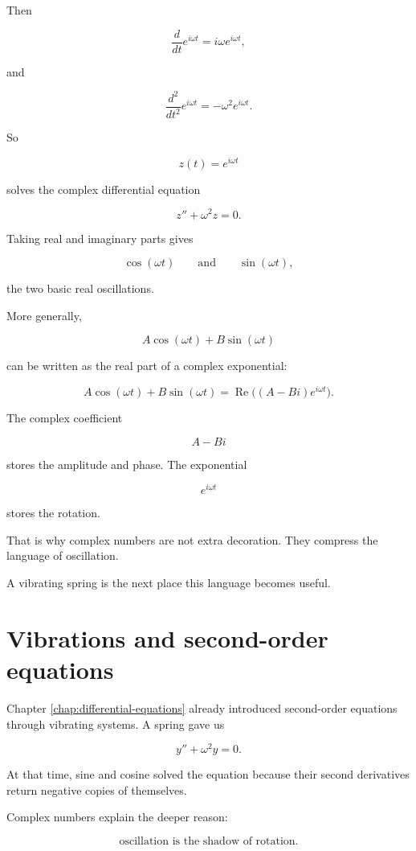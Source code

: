 Then

\[
\frac{d}{dt}e^{i\omega t}=i\omega e^{i\omega t},
\]

and

\[
\frac{d^2}{dt^2}e^{i\omega t}=-\omega^2 e^{i\omega t}.
\]

So

\[
\boxed{
z(t)=e^{i\omega t}
}
\]

solves the complex differential equation

\[
\boxed{
z''+\omega^2z=0.
}
\]

Taking real and imaginary parts gives

\[
\cos(\omega t)
\qquad\text{and}\qquad
\sin(\omega t),
\]

the two basic real oscillations.

More generally,

\[
A\cos(\omega t)+B\sin(\omega t)
\]

can be written as the real part of a complex exponential:

\[
\boxed{
A\cos(\omega t)+B\sin(\omega t)
=
\operatorname{Re}\bigl((A-Bi)e^{i\omega t}\bigr).
}
\]

The complex coefficient

\[
A-Bi
\]

stores the amplitude and phase.  The exponential

\[
e^{i\omega t}
\]

stores the rotation.

That is why complex numbers are not extra decoration.  They compress the language of
oscillation.

A vibrating spring is the next place this language becomes useful.

\section{Vibrations and second-order equations}
\label{sec:vibrations-second-order-equations}

Chapter \ref{chap:differential-equations} already introduced second-order equations
through vibrating systems.  A spring gave us

\[
y''+\omega^2y=0.
\]

At that time, sine and cosine solved the equation because their second derivatives return
negative copies of themselves.

Complex numbers explain the deeper reason:

\[
\text{oscillation is the shadow of rotation.}
\]

